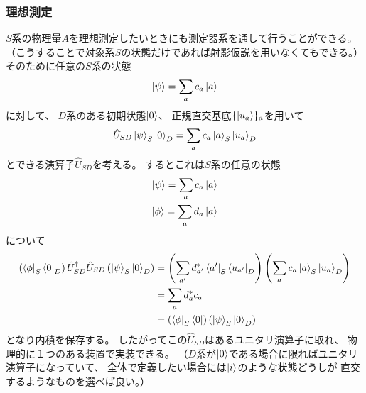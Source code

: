 \documentclass[a4paper, 10pt, uplatex]{jsarticle}
\begin{document}
\subsubsection{理想測定}
$S$系の物理量$A$を理想測定したいときにも測定器系を通して行うことができる。
（こうすることで対象系$S$の状態だけであれば射影仮説を用いなくてもできる。）
そのために任意の$S$系の状態
\begin{align}
	\Ket{\psi} = \sum_a c_a \Ket{a}
\end{align}
に対して、
$D$系のある初期状態$\Ket{0}$、
正規直交基底$\{ \Ket{u_a} \}_a$を用いて
\begin{align}
	\hat{U}_{SD} \Ket{\psi}_S \Ket{0}_D
	= \sum_a c_a \Ket{a}_S \Ket{u_a}_D
\end{align}
とできる演算子$\hat{U}_{SD}$を考える。
するとこれは$S$系の任意の状態
\begin{gather}
	\Ket{\psi} = \sum_a c_a \Ket{a} \\
	\Ket{\phi} = \sum_a d_a \Ket{a}
\end{gather}
について
\begin{align}
	\left( \Bra{\phi}_S \Bra{0}_D \right) \hat{U}^\dagger_{SD}
	\hat{U}_{SD} \left( \Ket{\psi}_S \Ket{0}_D \right)
	&= \left( \sum_{a'} d_{a'}^* \Bra{a'}_S \Bra{u_{a'}}_D \right)
	\left( \sum_a c_a \Ket{a}_S \Ket{u_a}_D \right) \\
	&= \sum_a d_a^* c_a \\
	&= \left( \Bra{\phi}_S \Bra{0} \right)
	\left( \Ket{\psi}_S \Ket{0}_D \right)
\end{align}
となり内積を保存する。
したがってこの$\hat{U}_{SD}$はあるユニタリ演算子に取れ、
物理的に１つのある装置で実装できる。
（$D$系が$\Ket{0}$である場合に限ればユニタリ演算子になっていて、
全体で定義したい場合には$\Ket{i}$のような状態どうしが
直交するようなものを選べば良い。）
\end{document}
